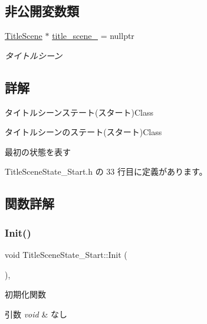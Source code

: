 \subsection*{非公開変数類}
\begin{DoxyCompactItemize}
\item 
\mbox{\hyperlink{class_title_scene}{Title\+Scene}} $\ast$ \mbox{\hyperlink{class_title_scene_state___start_a1a0dde9e9834cb18e0cf1e1ab12a2129}{title\+\_\+scene\+\_\+}} = nullptr
\begin{DoxyCompactList}\small\item\em タイトルシーン \end{DoxyCompactList}\end{DoxyCompactItemize}


\subsection{詳解}
タイトルシーンステート(スタート)Class 

タイトルシーンのステート(スタート)Class

最初の状態を表す 

 Title\+Scene\+State\+\_\+\+Start.\+h の 33 行目に定義があります。



\subsection{関数詳解}
\mbox{\label{class_title_scene_state___start_a3e785ba088ac3fd0989fd657e5d0cd34}} 
\subsubsection{\texorpdfstring{Init()}{Init()}}
{\footnotesize\ttfamily void Title\+Scene\+State\+\_\+\+Start\+::\+Init (\begin{DoxyParamCaption}{ }\end{DoxyParamCaption})\hspace{0.3cm}{\ttfamily [override]}, {\ttfamily [virtual]}}



初期化関数 


\begin{DoxyParams}{引数}
{\em void} & なし \\
\hline
\end{DoxyParams}

